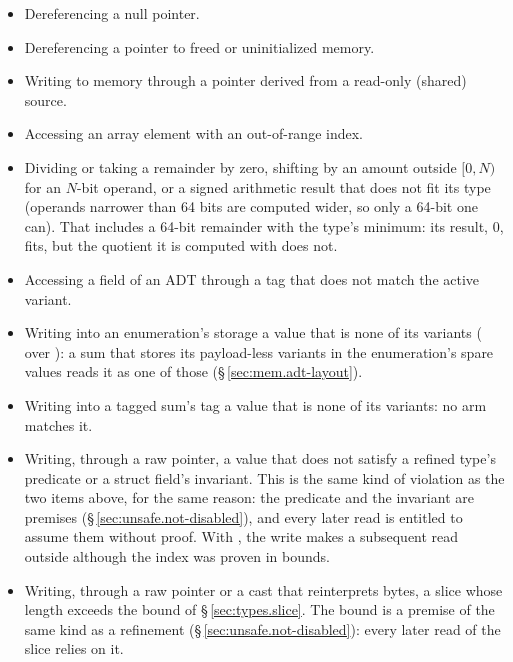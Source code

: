\begin{itemize}
  \item Dereferencing a null pointer.
  \item Dereferencing a pointer to freed or uninitialized memory.
  \item Writing to memory through a pointer derived from a read-only
        (shared) source.
  \item Accessing an array element with an out-of-range index.
  \item Dividing or taking a remainder by zero, shifting by an amount outside $[0, N)$ for an
        $N$-bit operand, or a signed arithmetic result that does not fit its type (operands
        narrower than 64 bits are computed wider, so only a 64-bit one can).  That includes
        a 64-bit remainder  with  the type's minimum: its result, 0,
        fits, but the quotient it is computed with does not.
  \item Accessing a field of an ADT through a tag that does not match
        the active variant.
  \item Writing into an enumeration's storage a value that is none of its
        variants ( over ): a sum
        that stores its payload-less variants in the enumeration's spare values reads it as
        one of those (\S\,\ref{sec:mem.adt-layout}).
  \item Writing into a tagged sum's tag a value that is none of its variants: no
         arm matches it.
  \item Writing, through a raw pointer, a value that does not satisfy a refined type's predicate
        or a struct field's invariant.  This is the same kind of violation as the two items above,
        for the same reason: the predicate and the invariant are premises
        (\S\,\ref{sec:unsafe.not-disabled}), and every later read is entitled to assume them
        without proof.  With , the write
         makes a subsequent  read outside
         although the index was proven in bounds.
  \item Writing, through a raw pointer or a cast that reinterprets bytes, a slice whose length
        exceeds the bound of \S\,\ref{sec:types.slice}.  The bound is a premise of the same kind
        as a refinement (\S\,\ref{sec:unsafe.not-disabled}): every later read of the slice
        relies on it.
\end{itemize}

